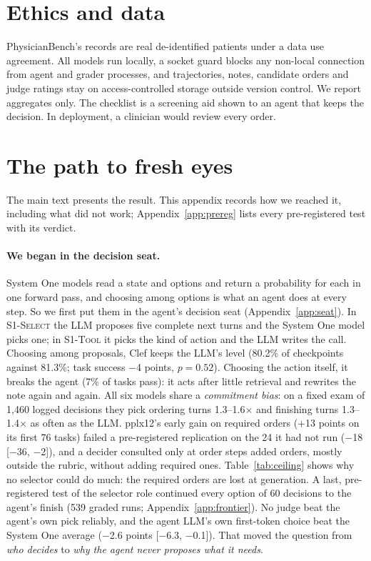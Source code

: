 \documentclass[11pt]{article}
\newcommand{\sel}{\textsc{S1-Select}}
\newcommand{\tool}{\textsc{S1-Tool}}
\begin{document}
\section*{Ethics and data}\label{sec:ethics}

PhysicianBench's records are real de-identified patients under a data use agreement. All models run locally, a socket
guard blocks any non-local connection from agent and grader processes, and trajectories, notes, candidate orders and
judge ratings stay on access-controlled storage outside version control. We report aggregates only. The checklist is
a screening aid shown to an agent that keeps the decision. In deployment, a clinician would review every order.



\appendix

\section{The path to fresh eyes}\label{app:path}

The main text presents the result. This appendix records how we reached it, including what did not work;
Appendix~\ref{app:prereg} lists every pre-registered test with its verdict.

\paragraph{We began in the decision seat.} System One models read a state and options and return a probability for
each in one forward pass, and choosing among options is what an agent does at every step. So we first put them in the
agent's decision seat (Appendix~\ref{app:seat}). In \sel{} the LLM proposes five complete next turns and the System
One model picks one; in \tool{} it picks the kind of action and the LLM writes the call. Choosing among proposals,
Clef keeps the LLM's level (80.2\% of checkpoints against 81.3\%; task success $-$4 points, $p=0.52$). Choosing the
action itself, it breaks the agent (7\% of tasks pass): it acts after little retrieval and rewrites the note again and
again. All six models share a \emph{commitment bias}: on a fixed exam of 1,460 logged decisions they pick ordering
turns 1.3--1.6$\times$ and finishing turns 1.3--1.4$\times$ as often as the LLM. pplx12's early gain on required orders
(+13 points on its first 76 tasks) failed a pre-registered replication on the 24 it had not run ($-$18 [$-$36, $-$2]),
and a decider consulted only at order steps added orders, mostly outside the rubric, without adding required ones.
Table~\ref{tab:ceiling} shows why no selector could do much: the required orders are lost at generation. A last,
pre-registered test of the selector role continued every option of 60 decisions to the agent's finish (539 graded
runs; Appendix~\ref{app:frontier}). No judge beat the agent's own pick reliably, and the agent LLM's own first-token
choice beat the System One average ($-$2.6 points [$-$6.3, $-$0.1]). That moved the question from \emph{who decides}
to \emph{why the agent never proposes what it needs}.
\end{document}
